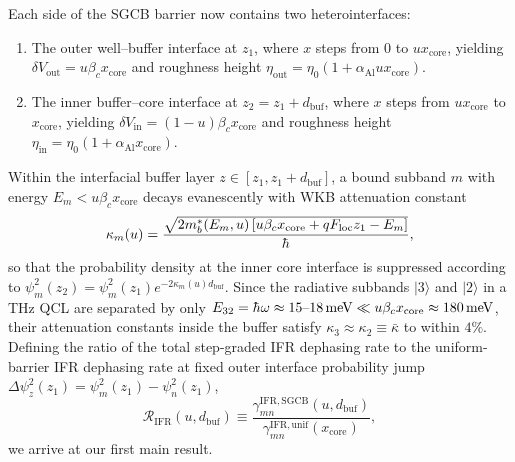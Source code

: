 \documentclass[11pt,letterpaper]{article}
\renewcommand{\hbar}{\mathchar'26\mkern-9mu h}
\begin{document}
Each side of the SGCB barrier now contains two heterointerfaces:
\begin{enumerate}
    \item The outer well--buffer interface at $z_1$, where $x$ steps from $0$ to $u x_{\mathrm{core}}$, yielding $\delta V_{\mathrm{out}} = u \beta_c x_{\mathrm{core}}$ and roughness height $\eta_{\mathrm{out}} = \eta_0(1 + \alpha_{\mathrm{Al}} u x_{\mathrm{core}})$.
    \item The inner buffer--core interface at $z_2 = z_1 + d_{\mathrm{buf}}$, where $x$ steps from $u x_{\mathrm{core}}$ to $x_{\mathrm{core}}$, yielding $\delta V_{\mathrm{in}} = (1 - u)\beta_c x_{\mathrm{core}}$ and roughness height $\eta_{\mathrm{in}} = \eta_0(1 + \alpha_{\mathrm{Al}} x_{\mathrm{core}})$.
\end{enumerate}
Within the interfacial buffer layer $z \in [z_1, z_1 + d_{\mathrm{buf}}]$, a bound subband $m$ with energy $E_m < u \beta_c x_{\mathrm{core}}$ decays evanescently with WKB attenuation constant
\begin{equation}
\kappa_m(u) = \frac{\sqrt{2 m_b^*(E_m, u)\left[u \beta_c x_{\mathrm{core}} + q F_{\mathrm{loc}} z_1 - E_m\right]}}{\hbar},
\label{eq:wkb_kappa}
\end{equation}
so that the probability density at the inner core interface is suppressed according to $\psi_m^2(z_2) = \psi_m^2(z_1) e^{-2\kappa_m(u) d_{\mathrm{buf}}}$. Since the radiative subbands $|3\rangle$ and $|2\rangle$ in a THz QCL are separated by only $E_{32} = \hbar\omega \approx 15\text{--}18\,\mathrm{meV} \ll u \beta_c x_{\mathrm{core}} \approx 180\,\mathrm{meV}$, their attenuation constants inside the buffer satisfy $\kappa_3 \approx \kappa_2 \equiv \bar{\kappa}$ to within $4\%$. Defining the ratio of the total step-graded IFR dephasing rate to the uniform-barrier IFR dephasing rate at fixed outer interface probability jump $\Delta\psi_z^2(z_1) = \psi_m^2(z_1) - \psi_n^2(z_1)$,
\begin{equation}
\mathcal{R}_{\mathrm{IFR}}(u, d_{\mathrm{buf}}) \equiv \frac{\gamma_{mn}^{\mathrm{IFR,SGCB}}(u, d_{\mathrm{buf}})}{\gamma_{mn}^{\mathrm{IFR,unif}}(x_{\mathrm{core}})},
\label{eq:r_ifr_def}
\end{equation}
we arrive at our first main result.
\end{document}
